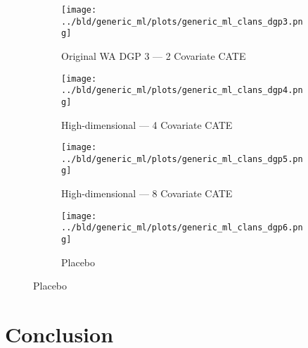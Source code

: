 \documentclass[11pt, a4paper, leqno]{article}
\begin{document}
\begin{figure}
    \caption{Simulation Results: Generic ML --- CLANS}\label{fig:clans}

    \centering
     \begin{subfigure}[b]{0.475\textwidth}
         \centering
         \texttt{[image: ../bld/generic\_ml/plots/generic\_ml\_clans\_dgp3.png]}
         \caption{Original WA DGP 3 --- 2 Covariate CATE}\label{fig_clans:dgp3}
     \end{subfigure}
     \hfill
     \begin{subfigure}[b]{0.475\textwidth}
         \centering
         \texttt{[image: ../bld/generic\_ml/plots/generic\_ml\_clans\_dgp4.png]}
         \caption{High-dimensional --- 4 Covariate CATE}\label{fig_clans:dgp4}
     \end{subfigure}

     \begin{subfigure}[b]{0.475\textwidth}
         \centering
         \texttt{[image: ../bld/generic\_ml/plots/generic\_ml\_clans\_dgp5.png]}
         \caption{High-dimensional --- 8 Covariate CATE}\label{fig_clans:dgp5}
     \end{subfigure}
     \begin{subfigure}[b]{0.475\textwidth}
         \centering
         \texttt{[image: ../bld/generic\_ml/plots/generic\_ml\_clans\_dgp6.png]}
         \caption{Placebo}\label{fig_clans:dgp6}
     \end{subfigure}



\end{figure}

\section{Conclusion}

\clearpage
\newpage

\printbibliography
{}


\end{document}
